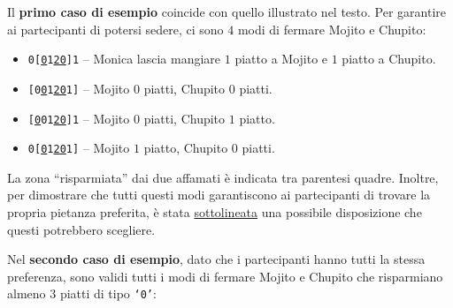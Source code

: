 

\Examples

\begin{example}
%
%
\end{example}



\Explanation

Il \textbf{primo caso di esempio} coincide con quello illustrato nel testo. Per
garantire ai partecipanti di potersi sedere, ci sono $4$ modi di fermare Mojito
e Chupito:

\begin{itemize}[nolistsep,itemsep=2mm]
	\item \texttt{0[\underline{0}1\underline{2}\underline{0}]1} -- Monica lascia mangiare $1$ piatto a Mojito e $1$ piatto a Chupito.
	\item \texttt{[0\underline{0}1\underline{2}\underline{0}1]} -- Mojito $0$ piatti, Chupito $0$ piatti.
	\item \texttt{[\underline{0}01\underline{2}\underline{0}]1} -- Mojito $0$ piatti, Chupito $1$ piatto.
	\item \texttt{0[\underline{0}1\underline{2}\underline{0}1]} -- Mojito $1$ piatto, Chupito $0$ piatti.
\end{itemize}

La zona ``risparmiata'' dai due affamati è indicata tra parentesi quadre.
Inoltre, per dimostrare che tutti questi modi garantiscono ai partecipanti di
trovare la propria pietanza preferita, è stata \underline{sottolineata} una
possibile disposizione che questi potrebbero scegliere.

Nel \textbf{secondo caso di esempio}, dato che i partecipanti hanno tutti la stessa
preferenza, sono validi tutti i modi di fermare Mojito e Chupito che
risparmiano almeno $3$ piatti di tipo \texttt{`0'}:

